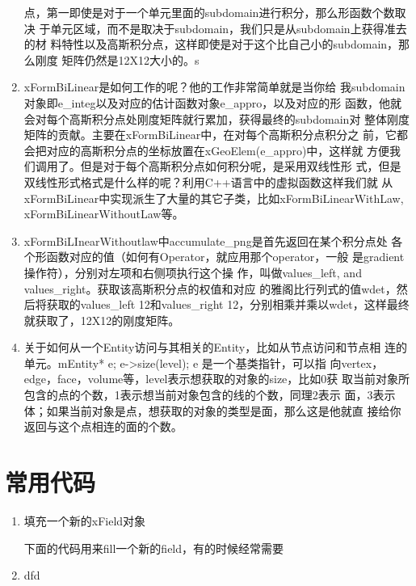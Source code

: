\documentclass{article}
\begin{document}
\begin{enumerate}
  点，第一即使是对于一个单元里面的subdomain进行积分，那么形函数个数取决
  于单元区域，而不是取决于subdomain，我们只是从subdomain上获得准去的材
  料特性以及高斯积分点，这样即使是对于这个比自己小的subdomain，那么刚度
  矩阵仍然是12X12大小的。s
\item xFormBiLinear是如何工作的呢？他的工作非常简单就是当你给
  我subdomain对象即e\_integ以及对应的估计函数对象e\_appro，以及对应的形
  函数，他就会对每个高斯积分点处刚度矩阵就行累加，获得最终的subdomain对
  整体刚度矩阵的贡献。主要在xFormBiLinear中，在对每个高斯积分点积分之
  前，它都会把对应的高斯积分点的坐标放置在xGeoElem(e\_appro)中，这样就
  方便我们调用了。但是对于每个高斯积分点如何积分呢，是采用双线性形
  式，但是双线性形式格式是什么样的呢？利用C++语言中的虚拟函数这样我们就
  从xFormBiLinear中实现派生了大量的其它子类，比如xFormBiLinearWithLaw,
  xFormBiLinearWithoutLaw等。
\item xFormBiLInearWithoutlaw中accumulate\_png是首先返回在某个积分点处
  各个形函数对应的值（如何有Operator，就应用那个operator，一般
  是gradient操作符），分别对左项和右侧项执行这个操
  作，叫做values\_left, and values\_right。获取该高斯积分点的权值和对应
  的雅阁比行列式的值wdet，然后将获取的values\_left 12和values\_right
  12，分别相乘并乘以wdet，这样最终就获取了，12X12的刚度矩阵。
\item 关于如何从一个Entity访问与其相关的Entity，比如从节点访问和节点相
  连的单元。mEntity{*} e; e->size(level); e 是一个基类指针，可以指
  向vertex，edge，face，volume等，level表示想获取的对象的size，比如0获
  取当前对象所包含的点的个数，1表示想当前对象包含的线的个数，同理2表示
  面，3表示体；如果当前对象是点，想获取的对象的类型是面，那么这是他就直
  接给你返回与这个点相连的面的个数。
\end{enumerate}

\section{常用代码}
\label{sec:utility-codes}

\begin{enumerate}
\item 填充一个新的xField对象

下面的代码用来fill一个新的field，有的时候经常需要



\item dfd

\end{enumerate}
\end{document}
